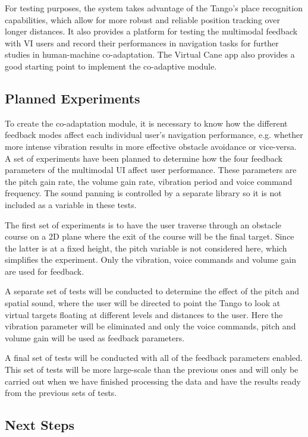 \documentclass[letterpaper]{article}
\begin{document}
For testing purposes, the system takes advantage of the Tango's place recognition capabilities, which allow for more robust and reliable position tracking over longer distances. It also provides a platform for testing the multimodal feedback with VI users and record their performances in navigation tasks for further studies in human-machine co-adaptation. The Virtual Cane app also provides a good starting point to implement the co-adaptive module. 

\subsection{Planned Experiments}

To create the co-adaptation module, it is necessary to know how the different feedback modes affect each individual user's navigation performance, e.g. whether more intense vibration results in more effective obstacle avoidance or vice-versa. A set of experiments have been planned to determine how the four feedback parameters of the multimodal UI affect user performance. These parameters are the pitch gain rate, the volume gain rate, vibration period and voice command frequency. The sound panning is controlled by a separate library so it is not included as a variable in these tests. 

The first set of experiments is to have the user traverse through an obstacle course on a 2D plane where the exit of the course will be the final target. Since the latter is at a fixed height, the pitch variable is not considered here, which simplifies the experiment. Only the vibration, voice commands and volume gain are used for feedback. 

A separate set of tests will be conducted to determine the effect of the pitch and spatial sound, where the user will be directed to point the Tango to look at virtual targets floating at different levels and distances to the user. Here the vibration parameter will be eliminated and only the voice commands, pitch and volume gain will be used as feedback parameters. 

A final set of tests will be conducted with all of the feedback parameters enabled. This set of tests will be more large-scale than the previous ones and will only be carried out when we have finished processing the data and have the results ready from the previous sets of tests. 

\subsection{Next Steps}
\end{document}
